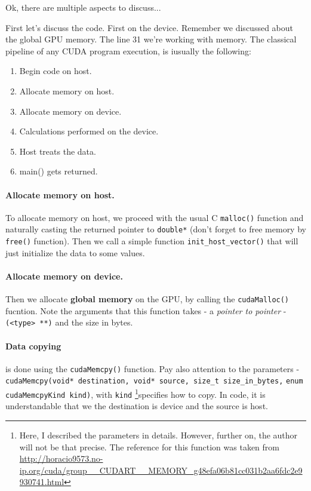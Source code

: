 \documentclass[12pt]{article}
\begin{document}
Ok, there are multiple aspects to discuss...

First let's discuss the code. First on the device. Remember we discussed about the global GPU memory. 
The line 31 we're working with memory. The classical pipeline of any CUDA program
execution, is iusually the following:

\begin{enumerate}
\setlength\itemsep{-0.5em}
   \item Begin code on host.
   \item Allocate memory on host.
   \item Allocate memory on device.
   \item Calculations performed on the device.
   \item Host treats the data.
   \item main() gets returned.
\end{enumerate} 

\paragraph{Allocate memory on host.} To allocate memory on host, 
we proceed with the usual C \verb|malloc()| function and naturally 
casting the returned pointer to \verb|double*| (don't forget 
to free memory by \verb|free()| function). 
Then we call a simple function \verb|init_host_vector()| that will just initialize the data 
to some values. 
\paragraph{Allocate memory on device.} Then we allocate \textbf{global memory} on the GPU, 
by calling the \verb|cudaMalloc()| fucntion. Note the arguments that this function takes - 
a \textit{pointer to pointer} - \verb|(<type> **)| and the size in bytes. 

\vspace{-0.8cm}
\paragraph{Data copying} is done using the \verb|cudaMemcpy()| function. Pay also attention 
to the parameters - 
\verb|cudaMemcpy(void* destination, void* source, size_t size_in_bytes,| \newline \verb|enum cudaMemcpyKind kind)|,
with \verb|kind| \footnote{Here, I described the parameters in details. However, further on,
the author will not be that precise. The reference for this function was taken from 
\url{http://horacio9573.no-ip.org/cuda/group__CUDART__MEMORY_g48efa06b81cc031b2aa6fdc2e9930741.html} }specifies how to copy. In code, it is understandable that we the destination is 
device and the source is host.
\end{document}
